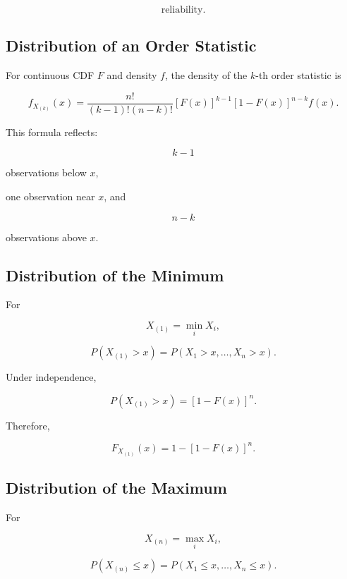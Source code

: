 \[
\boxed{
\text{reliability}.
}
\]

\subsection{Distribution of an Order Statistic}
\label{subsec:order-statistic-density}

For continuous CDF \(F\) and density \(f\), the density of the
\(k\)-th order statistic is

\[
\boxed{
f_{X_{(k)}}(x)
=
\frac{
n!
}{
(k-1)!(n-k)!
}
[F(x)]^{k-1}
[1-F(x)]^{n-k}
f(x).
}
\]

This formula reflects:

\[
k-1
\]

observations below \(x\),

one observation near \(x\), and

\[
n-k
\]

observations above \(x\).

\subsection{Distribution of the Minimum}
\label{subsec:minimum-order-statistic}

For

\[
X_{(1)}
=
\min_iX_i,
\]

\[
P
(
X_{(1)}>x
)
=
P
(
X_1>x,\ldots,X_n>x
).
\]

Under independence,

\[
\boxed{
P
(
X_{(1)}>x
)
=
[1-F(x)]^n.
}
\]

Therefore,

\[
\boxed{
F_{X_{(1)}}(x)
=
1-
[1-F(x)]^n.
}
\]

\subsection{Distribution of the Maximum}
\label{subsec:maximum-order-statistic}

For

\[
X_{(n)}
=
\max_iX_i,
\]

\[
P
(
X_{(n)}\leq x
)
=
P
(
X_1\leq x,\ldots,X_n\leq x
).
\]


